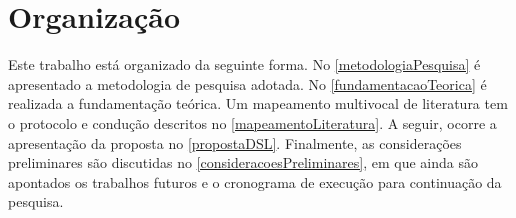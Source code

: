 \section{Organização}

Este trabalho está organizado da seguinte forma. 
No \autoref{metodologiaPesquisa} é apresentado a metodologia de pesquisa adotada. 
No \autoref{fundamentacaoTeorica} é realizada a fundamentação teórica. Um mapeamento multivocal de literatura tem o protocolo e condução descritos no \autoref{mapeamentoLiteratura}. 
A seguir, ocorre a apresentação da proposta no \autoref{propostaDSL}. 
Finalmente, as considerações preliminares são discutidas no \autoref{consideracoesPreliminares}, em que ainda são apontados os trabalhos futuros e o cronograma de execução para continuação da pesquisa.